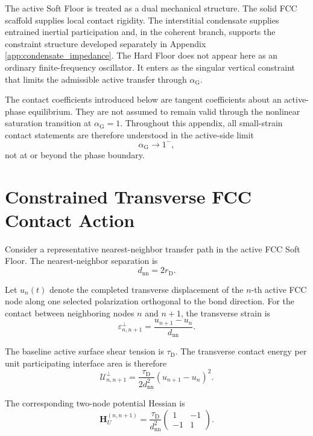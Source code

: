 The active Soft Floor is treated as a dual mechanical structure. The solid FCC scaffold supplies local contact rigidity. The interstitial condensate supplies entrained inertial participation and, in the coherent branch, supports the constraint structure developed separately in Appendix \ref{app:condensate_impedance}. The Hard Floor does not appear here as an ordinary finite-frequency oscillator. It enters as the singular vertical constraint that limits the admissible active transfer through $\alpha_{\mathrm{G}}$.

The contact coefficients introduced below are tangent coefficients about an active-phase equilibrium. They are not assumed to remain valid through the nonlinear saturation transition at $\alpha_{\mathrm{G}}=1$. Throughout this appendix, all small-strain contact statements are therefore understood in the active-side limit
\begin{equation}
    \alpha_{\mathrm{G}} \rightarrow 1^-,
\end{equation}
not at or beyond the phase boundary.

\section{Constrained Transverse FCC Contact Action}

Consider a representative nearest-neighbor transfer path in the active FCC Soft Floor. The nearest-neighbor separation is
\begin{equation}
    d_{\mathrm{nn}} = 2r_{\mathrm{D}}.
\end{equation}

Let $u_n(t)$ denote the completed transverse displacement of the $n$-th active FCC node along one selected polarization orthogonal to the bond direction. For the contact between neighboring nodes $n$ and $n+1$, the transverse strain is
\begin{equation}
    \varepsilon_{n,n+1}^{\perp} = \frac{u_{n+1}-u_n}{d_{\mathrm{nn}}}.
\end{equation}

The baseline active surface shear tension is $\tau_{\mathrm{D}}$. The transverse contact energy per unit participating interface area is therefore
\begin{equation}
    \mathcal{U}_{n,n+1}^{\perp} = \frac{\tau_{\mathrm{D}}}{2d_{\mathrm{nn}}^2} \left(u_{n+1}-u_n\right)^2.
\end{equation}

The corresponding two-node potential Hessian is
\begin{equation}
    \mathbf{H}_U^{(n,n+1)} = \frac{\tau_{\mathrm{D}}}{d_{\mathrm{nn}}^2}
    \begin{pmatrix}
        1 & -1 \\
        -1 & 1
    \end{pmatrix}.
\end{equation}

